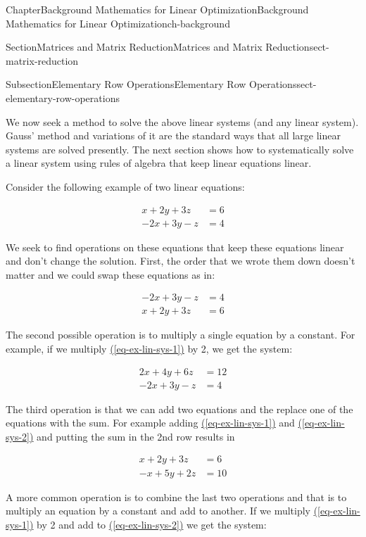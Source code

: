 \documentclass[oneside,10pt,]{book}
\newcommand{\xreffont}{\relax}
\numberwithin{equation}{section}
\newcommand{\amp}{&}
\begin{document}
\begin{chapterptx}{Chapter}{Background Mathematics for Linear Optimization}{}{Background Mathematics for Linear Optimization}{}{}{ch-background}
\begin{sectionptx}{Section}{Matrices and Matrix Reduction}{}{Matrices and Matrix Reduction}{}{}{sect-matrix-reduction}
\begin{subsectionptx}{Subsection}{Elementary Row Operations}{}{Elementary Row Operations}{}{}{sect-elementary-row-operations}
\begin{introduction}{}%
We now seek a method to solve the above linear systems (and any linear system). Gauss' method and variations of it are the standard ways that all large linear systems are solved presently. The next section shows how to systematically solve a linear system using rules of algebra that keep linear equations linear.%
\par
Consider the following example of two linear equations:%
\par
%
\begin{align}
x+2y+3z \amp =6 \label{eq-ex-lin-sys-1}\\
-2x+3y-z \amp =4 \label{eq-ex-lin-sys-2}
\end{align}
%
\par
We seek to find operations on these equations that keep these equations linear and don't change the solution. First, the order that we wrote them down doesn't matter and we could swap these equations as in:%
\par
%
\begin{align*}
-2x+3y-z \amp =4 \\
x+2y+3z \amp =6
\end{align*}
%
\par
The second possible operation is to multiply a single equation by a constant. For example, if we multiply  \hyperref[eq-ex-lin-sys-1]{({\xreffont\ref{eq-ex-lin-sys-1}})} by 2, we get the system:%
\par
%
\begin{align*}
2x+4y+6z \amp =12 \\
-2x+3y-z \amp =4
\end{align*}
%
\par
The third operation is that we can add two equations and the replace one of the equations with the sum. For example adding \hyperref[eq-ex-lin-sys-1]{({\xreffont\ref{eq-ex-lin-sys-1}})} and \hyperref[eq-ex-lin-sys-2]{({\xreffont\ref{eq-ex-lin-sys-2}})} and putting the sum in the 2nd row results in%
\par
%
\begin{align*}
x+2y+3z \amp =6 \\
-x+5y+2z \amp =10
\end{align*}
%
\par
A more common operation is to combine the last two operations and that is to multiply an equation by a constant and add to another. If we multiply \hyperref[eq-ex-lin-sys-1]{({\xreffont\ref{eq-ex-lin-sys-1}})} by 2 and add to \hyperref[eq-ex-lin-sys-2]{({\xreffont\ref{eq-ex-lin-sys-2}})} we get the system:%

\end{introduction}
\end{subsectionptx}
\end{sectionptx}
\end{chapterptx}
\end{document}

